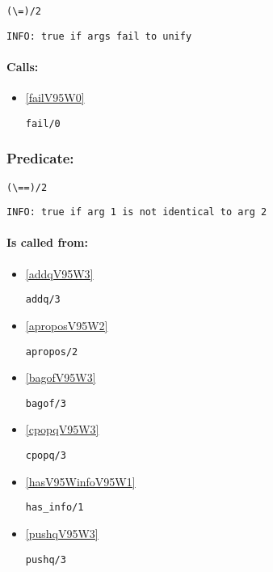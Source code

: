 \begin{verbatim}
(\=)/2
\end{verbatim}

{\small \begin{verbatim}
INFO: true if args fail to unify

\end{verbatim}}
\paragraph{Calls:} 
\begin{itemize}
\item \ref{failV95W0} 
\begin{verbatim}
fail/0
\end{verbatim}

\end{itemize}

\subsubsection{Predicate:} \label{V92WV61WV61WV95W2}

\begin{verbatim}
(\==)/2
\end{verbatim}

{\small \begin{verbatim}
INFO: true if arg 1 is not identical to arg 2

\end{verbatim}}
\paragraph{Is called from:} 
\begin{itemize}
\item \ref{addqV95W3} 
\begin{verbatim}
addq/3
\end{verbatim}

\item \ref{aproposV95W2} 
\begin{verbatim}
apropos/2
\end{verbatim}

\item \ref{bagofV95W3} 
\begin{verbatim}
bagof/3
\end{verbatim}

\item \ref{cpopqV95W3} 
\begin{verbatim}
cpopq/3
\end{verbatim}

\item \ref{hasV95WinfoV95W1} 
\begin{verbatim}
has_info/1
\end{verbatim}

\item \ref{pushqV95W3} 
\begin{verbatim}
pushq/3
\end{verbatim}

\end{itemize}

